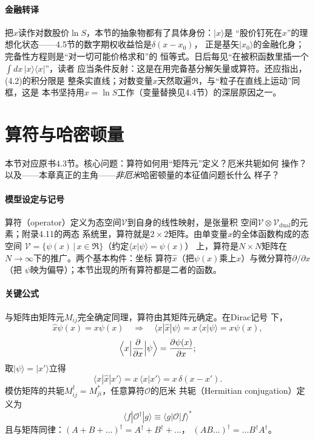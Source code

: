 \paragraph{金融转译}
把$x$读作对数股价$\ln S$，本节的抽象物都有了具体身份：$|x\rangle$是
“股价钉死在$x$”的理想化状态——4.5节的数字期权收益恰是$\delta(x-x_0)$，
正是基矢$|x_0\rangle$的金融化身；完备性方程则是“对一切可能价格求和”的
恒等式。日后每见“在被积函数里插一个$\int dx\,|x\rangle\langle x|$”，读者
应当条件反射：这是在用完备基分解矢量或算符。还应指出，(4.2)的积分限是
整条实直线；对数变量$x$天然取遍$\Re$，与“粒子在直线上运动”同框，这是
本书坚持用$x=\ln S$工作（变量替换见4.4节）的深层原因之一。

\section{算符与哈密顿量}

本节对应原书4.3节。核心问题：算符如何用“矩阵元”定义？厄米共轭如何
操作？以及——本章真正的主角——\emph{非厄米}哈密顿量的本征值问题长什么
样子？

\paragraph{模型设定与记号}
算符（operator）定义为态空间$\mathcal{V}$到自身的线性映射，是张量积
空间$\mathcal{V}\otimes\mathcal{V}_{\mathrm{dual}}$的元素；附录4.11的两态
系统里，算符就是$2\times2$矩阵。由单变量$x$的全体函数构成的态空间
$\mathcal{V}=\{\psi(x)\,|\,x\in\Re\}$（约定$\langle x|\psi\rangle=\psi(x)$）
上，算符是$N\times N$矩阵在$N\to\infty$下的推广。两个基本构件：坐标
算符$\hat{x}$（把$\psi(x)$乘上$x$）与微分算符$\partial/\partial x$（把
$\psi$映为偏导）；本节出现的所有算符都是二者的函数。

\paragraph{关键公式}
与矩阵由矩阵元$M_{ij}$完全确定同理，算符由其矩阵元确定。在Dirac记号
下，
\begin{equation*}
\hat{x}\psi(x)=x\psi(x)
\quad\Longrightarrow\quad
\langle x|\hat{x}|\psi\rangle=x\,\langle x|\psi\rangle=x\psi(x),
\end{equation*}
\begin{equation*}
\Bigl\langle x\Bigl|\frac{\partial}{\partial x}\Bigr|\psi\Bigr\rangle
=\frac{\partial\psi(x)}{\partial x};
\end{equation*}
取$|\psi\rangle=|x'\rangle$立得
\begin{equation*}
\langle x|\hat{x}|x'\rangle=x\,\langle x|x'\rangle=x\,\delta(x-x').
\end{equation*}
模仿矩阵的共轭$M^{\dagger}_{ij}=M^{*}_{ji}$，任意算符$\mathcal{O}$的厄米
共轭（Hermitian conjugation）定义为
\begin{equation*}
\langle f|\mathcal{O}^{\dagger}|g\rangle\equiv
\langle g|\mathcal{O}|f\rangle^{*}
\tag{4.4}
\end{equation*}
且与矩阵同律：$(A+B+\ldots)^{\dagger}=A^{\dagger}+B^{\dagger}+\ldots$，
$(AB\ldots)^{\dagger}=\ldots B^{\dagger}A^{\dagger}$。

